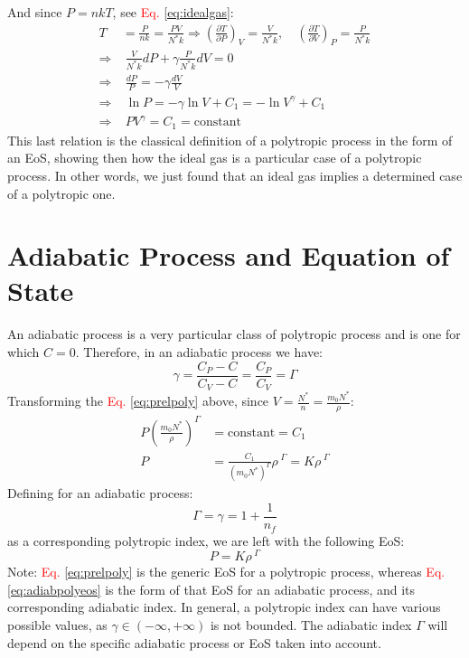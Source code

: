 \documentclass[12pt]{report}
\newcommand\red[1]{\textcolor{red}{#1}}
\begin{document}
	And since $P= nkT$, see \textcolor{red}{Eq. \ref{eq:idealgas}}:
	\begin{align}
		T &= \frac{P}{nk} =\frac{PV}{N^*k}\Rightarrow \boxed{\left(\frac{\partial T}{\partial P}\right)_V = \frac{V}{N^*k}, \quad
			\left(\frac{\partial T}{\partial V}\right)_P = \frac{P}{N^* k}} \\
		\Rightarrow &\;\frac{V}{N^*k}dP + \gamma\frac{P}{N^*k}dV = 0 \\
		\Rightarrow &\;\frac{dP}{P} = -\gamma\frac{dV}{V}\\
		\Rightarrow &\;\ln P = -\gamma\ln V + C_1 =-\ln V^\gamma + C_1 \\
		\Rightarrow &\; \boxed{PV^\gamma = C_1 = \text{constant}} \label{eq:prelpoly}
	\end{align} 
	This last relation is the classical definition of a polytropic process in the form of an EoS, showing then how the ideal gas is a particular case of a polytropic process. In other words, we just found that an ideal gas implies a determined case of a polytropic one. 
	\section{Adiabatic Process and Equation of State}
	An adiabatic process is a very particular class of polytropic process and is one for which $C=0$. Therefore, in an adiabatic process we have:
	\begin{equation}
		\gamma = \dfrac{C_P-C}{C_V-C} = \dfrac{C_P}{C_V} = \Gamma
	\end{equation}
	Transforming the \red{Eq. \ref{eq:prelpoly}} above, since $ V = \frac{N^*}{n} = \frac{m_0N^*}{\rho}$:
	\begin{align}
		P\left(\frac{m_0N^*}{\rho}\right)^{\Gamma} &= \text{constant} = C_1 \\
		P &= \frac{C_1}{(m_0N^*)^{\Gamma}} \rho^{\;\Gamma}= K\rho^{\;\Gamma}
	\end{align}
	Defining for an adiabatic process: 
	\begin{equation}
		\Gamma = \gamma = 1 + \frac{1}{n_f}
	\end{equation}
	as a corresponding polytropic index, we are left with the following EoS:
	\begin{equation}
		P = K\rho^{\;\Gamma} \label{eq:adiabpolyeos}
	\end{equation}
	Note: \red{Eq. \ref{eq:prelpoly}} is the generic EoS for a polytropic process, whereas \red{Eq. \ref{eq:adiabpolyeos}} is the form of that EoS for an adiabatic process, and its corresponding adiabatic index. In general, a polytropic index can have various possible values, as $\gamma \in (-\infty,+\infty)$ is not bounded. The adiabatic index $\Gamma$ will depend on the specific adiabatic process or EoS taken into account.\\
	
\end{document}

